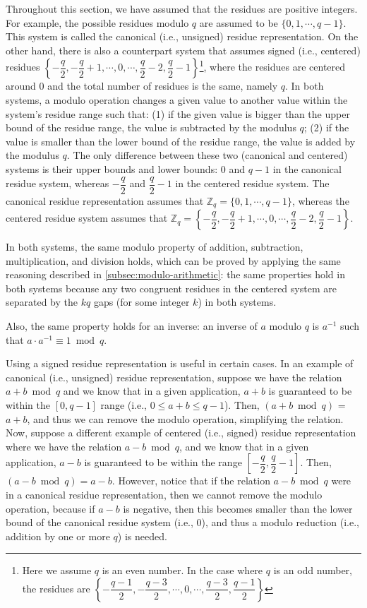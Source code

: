 Throughout this section, we have assumed that the residues are positive integers. For example, the possible residues modulo $q$ are assumed to be $\{0, 1, \cdots, q-1\}$. This system is called the canonical (i.e., unsigned) residue representation. On the other hand, there is also a counterpart system that assumes signed (i.e., centered) residues $\left\{-\dfrac{q}{2}, -\dfrac{q}{2} + 1, \cdots, 0, \cdots, \dfrac{q}{2} - 2, \dfrac{q}{2} - 1\right\}$\footnote{Here we assume $q$ is an even number. In the case where $q$ is an odd number, the residues are $\left\{ -\dfrac{q-1}{2}, -\dfrac{q-3}{2}, \cdots, 0, \cdots, \dfrac{q-3}{2}, \dfrac{q-1}{2}\right\}$}, where the residues are centered around $0$ and the total number of residues is the same, namely $q$. In both systems, a modulo operation changes a given value to another value within the system's residue range such that: (1) if the given value is bigger than the upper bound of the residue range, the value is subtracted by the modulus $q$; (2) if the value is smaller than the lower bound of the residue range, the value is added by the modulus $q$. The only difference between these two (canonical and centered) systems is their upper bounds and lower bounds: $0$ and $q-1$ in the canonical residue system, whereas $-\dfrac{q}{2}$ and $\dfrac{q}{2} - 1$ in the centered residue system. The canonical residue representation assumes that $\mathbb{Z}_q = \{0, 1, \cdots, q-1\}$, whereas the centered residue system assumes that $\mathbb{Z}_q = \left\{-\dfrac{q}{2}, -\dfrac{q}{2} + 1, \cdots, 0, \cdots, \dfrac{q}{2} - 2, \dfrac{q}{2} - 1\right\}$. 

In both systems, the same modulo property of addition, subtraction, multiplication, and division holds, which can be proved by applying the same reasoning described in \autoref{subsec:modulo-arithmetic}: the same properties hold in both systems because any two congruent residues in the centered system are separated by the $kq$ gaps (for some integer $k$) in both systems. 

Also, the same property holds for an inverse: an inverse of $a$ modulo $q$ is $a^{-1}$ such that $a \cdot a^{-1} \equiv 1 \bmod q$. 

Using a signed residue representation is useful in certain cases. In an example of canonical (i.e., unsigned) residue representation, suppose we have the relation $a + b \bmod q$ and we know that in a given application, $a + b$ is guaranteed to be within the $[0, q-1]$ range (i.e., $0 \leq a + b \leq q-1$). Then, $(a + b \bmod q)$ = $a + b$, and thus we can remove the modulo operation, simplifying the relation. Now, suppose a different example of centered (i.e., signed) residue representation where we have the relation $a - b \bmod q$, and we know that in a given application, $a - b$ is guaranteed to be within the range $\left[-\dfrac{q}{2}, \dfrac{q}{2} - 1\right]$. Then, $(a - b \bmod q) = a - b$. However, notice that if the relation $a - b \bmod q$ were in a canonical residue representation, then we cannot remove the modulo operation, because if $a - b$ is negative, then this becomes smaller than the lower bound of the canonical residue system (i.e., $0$), and thus a modulo reduction (i.e., addition by one or more $q$) is needed. 

